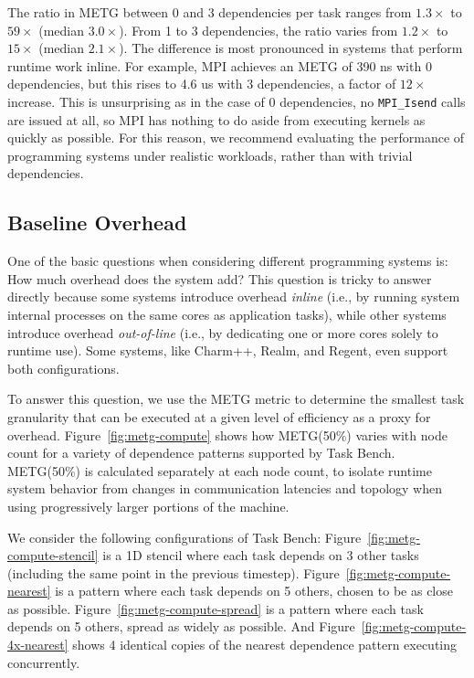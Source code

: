 The ratio in METG between 0 and 3 dependencies per task ranges from
$1.3\times$ to $59\times$ (median $3.0\times$). From 1 to 3
dependencies, the ratio varies from $1.2\times$ to $15\times$ (median
$2.1\times$). The difference is most pronounced in systems that
perform runtime work inline. For example, MPI achieves an METG of 390
ns with 0 dependencies, but this rises to 4.6 us with 3 dependencies,
a factor of $12\times$ increase. This is unsurprising as in the case
of 0 dependencies, no \lstinline[language=C++]{MPI_Isend} calls are
issued at all, so MPI has nothing to do aside from executing kernels
as quickly as possible. For this reason, we recommend evaluating the performance of
programming systems under realistic workloads, rather than with
trivial dependencies.

\subsection{Baseline Overhead}



One of the basic questions when considering different programming
systems is: How much overhead does the system add? This question is tricky to answer directly because some systems introduce
overhead \emph{inline} (i.e., by running system internal processes on
the same cores as application tasks), while other systems introduce
overhead \emph{out-of-line} (i.e., by dedicating one or more cores
solely to runtime use). Some systems, like Charm++, Realm, and Regent,
even support both configurations.

To answer this question, we use the METG metric to determine the
smallest task granularity that can be executed at a given level of
efficiency as a proxy for overhead. Figure~\ref{fig:metg-compute}
shows how METG(50\%) varies with node count for a variety of
dependence patterns supported by Task Bench. METG(50\%) is calculated
separately at each node count, to isolate runtime system behavior from
changes in communication latencies and topology when using
progressively larger portions of the machine.

We consider the following configurations of Task Bench:
Figure~\ref{fig:metg-compute-stencil} is a 1D stencil where each task
depends on 3 other tasks (including the same point in the previous
timestep). Figure~\ref{fig:metg-compute-nearest} is a pattern where
each task depends on 5 others, chosen to be as close as
possible. Figure~\ref{fig:metg-compute-spread} is a pattern where each
task depends on 5 others, spread as widely as possible. And
Figure~\ref{fig:metg-compute-4x-nearest} shows 4 identical copies of
the nearest dependence pattern executing concurrently.

